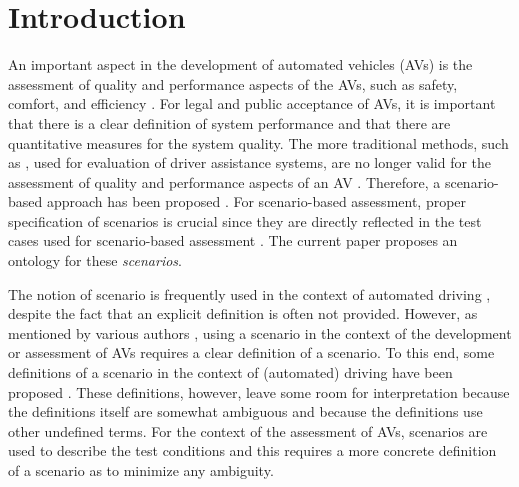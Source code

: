 \section{Introduction}
\label{sec:introduction}

An important aspect in the development of automated vehicles (AVs) is the assessment of quality and performance aspects of the AVs, such as safety, comfort, and efficiency \cite{bengler2014threedecades, stellet2015taxonomy, Helmer2017safety, putz2017pegasus, roesener2017comprehensive, gietelink2006development, roesener2016scenariobased, wachenfeld2016release}. 
For legal and public acceptance of AVs, it is important that there is a clear definition of system performance and that there are quantitative measures for the system quality. 
The more traditional methods, such as \cite{response2006code, ISO26262}, used for evaluation of driver assistance systems, are no longer valid for the assessment of quality and performance aspects of an AV \cite{wachenfeld2016release}. 
Therefore, a scenario-based approach has been proposed \cite{roesener2016scenariobased, putz2017pegasus}. 
For scenario-based assessment, proper specification of scenarios is crucial since they are directly reflected in the test cases used for scenario-based assessment \cite{stellet2015taxonomy}. 
The current paper proposes an ontology for these \emph{scenarios}.

The notion of scenario is frequently used in the context of automated driving \cite{putz2017pegasus, roesener2017comprehensive, gietelink2006development, hulshof2013autonomous, karaduman2013interactivebehavior, englund2016grand, xu2002effects, ebner2011identifying, ploeg2017GCDC, zofka2015datadrivetrafficscenarios}, despite the fact that an explicit definition is often not provided. However, as mentioned by various authors \cite{stellet2015taxonomy, Helmer2017safety, alvarez2017prospective, zofka2015datadrivetrafficscenarios, aparicio2013pre, lesemann2011test, putz2017pegasus, geyer2014, ulbrich2015}, using a scenario in the context of the development or assessment of AVs requires a clear definition of a scenario. To this end, some definitions of a scenario in the context of (automated) driving have been proposed \cite{geyer2014, ulbrich2015, elrofai2016scenario}.
\cbstart
These definitions, however, leave some room for interpretation because the definitions itself are somewhat ambiguous and because the definitions use other undefined terms.
For the context of the assessment of AVs, scenarios are used to describe the test conditions \cite{stellet2015taxonomy} and this requires a more concrete definition of a scenario as to minimize any ambiguity.
\cbend

